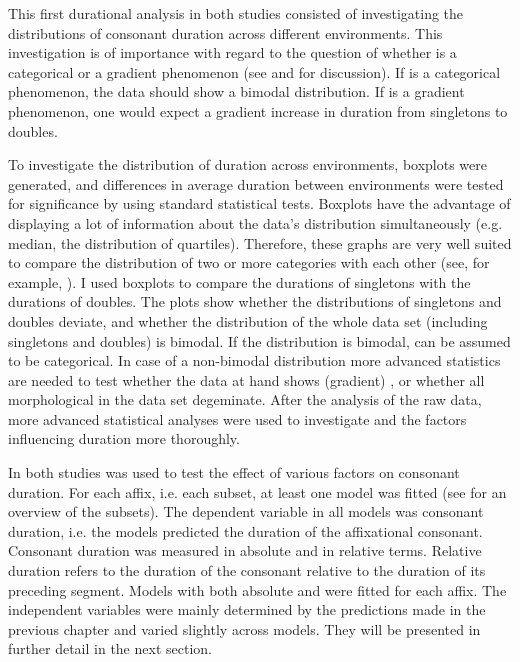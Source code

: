 This first durational analysis in both studies consisted of investigating the distributions of consonant duration across different environments. This investigation is of importance with regard to the question of whether  is a categorical or a gradient phenomenon (see  and  for discussion). If  is a categorical phenomenon, the data should show a bimodal distribution. If  is a gradient phenomenon, one would expect a gradient increase in duration from singletons to doubles.

 To investigate the distribution of duration across environments, boxplots were generated, and differences in average duration between environments were tested for significance by using standard statistical tests. Boxplots have the advantage of displaying a lot of information about the data's distribution simultaneously (e.g. median, the distribution of quartiles). Therefore, these graphs are very well suited to compare the distribution of two or more categories with each other (see, for example, \citealt{Benjamini.1988}).  
 I used boxplots to compare the durations of singletons with the durations of doubles. The plots show whether the distributions of singletons and doubles deviate, and whether the distribution of the whole data set (including singletons and doubles) is bimodal. If the distribution is bimodal,  can be assumed to be categorical.
  In case of a non-bimodal distribution more advanced statistics are needed to test whether the data at hand shows (gradient) , or whether all morphological  in the data set {degeminate}.
 After the analysis of the raw data, more advanced statistical analyses were used to investigate  and the factors influencing duration more thoroughly.


In both studies  was used to test the effect of various factors on consonant duration. For each affix, i.e. each subset, at least one model was fitted (see  for an overview of the subsets). The dependent variable in all models was consonant duration, i.e. the models predicted the duration of the affixational consonant. Consonant duration was measured in absolute and in relative terms. Relative duration refers to the duration of the consonant relative to the duration of its preceding segment. Models with both absolute and  were fitted for each affix.
The independent variables were mainly determined by the predictions made in the previous chapter and varied slightly across models. They will be presented in further detail in the next section.


